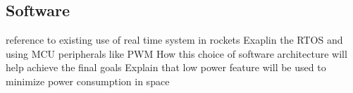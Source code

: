 \subsection{Software}

reference to existing use of real time system in rockets
Exaplin the RTOS
and using MCU peripherals like PWM
How this choice of software architecture will help achieve the final goals
Explain that low power feature will be used to minimize power consumption in space